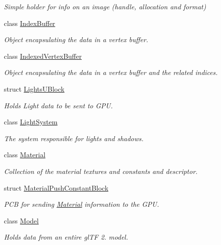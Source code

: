 \begin{DoxyCompactItemize}
\begin{DoxyCompactList}\small\item\em Simple holder for info on an image (handle, allocation and format) \end{DoxyCompactList}\item 
class \hyperlink{classblaze_1_1IndexBuffer}{Index\+Buffer}
\begin{DoxyCompactList}\small\item\em Object encapsulating the data in a vertex buffer. \end{DoxyCompactList}\item 
class \hyperlink{classblaze_1_1IndexedVertexBuffer}{Indexed\+Vertex\+Buffer}
\begin{DoxyCompactList}\small\item\em Object encapsulating the data in a vertex buffer and the related indices. \end{DoxyCompactList}\item 
struct \hyperlink{structblaze_1_1LightsUBlock}{Lights\+U\+Block}
\begin{DoxyCompactList}\small\item\em Holds Light data to be sent to G\+PU. \end{DoxyCompactList}\item 
class \hyperlink{classblaze_1_1LightSystem}{Light\+System}
\begin{DoxyCompactList}\small\item\em The system responsible for lights and shadows. \end{DoxyCompactList}\item 
class \hyperlink{classblaze_1_1Material}{Material}
\begin{DoxyCompactList}\small\item\em Collection of the material textures and constants and descriptor. \end{DoxyCompactList}\item 
struct \hyperlink{structblaze_1_1MaterialPushConstantBlock}{Material\+Push\+Constant\+Block}
\begin{DoxyCompactList}\small\item\em P\+CB for sending \hyperlink{classblaze_1_1Material}{Material} information to the G\+PU. \end{DoxyCompactList}\item 
class \hyperlink{classblaze_1_1Model}{Model}
\begin{DoxyCompactList}\small\item\em Holds data from an entire gl\+TF 2. model. \end{DoxyCompactList}\item 

\end{DoxyCompactItemize}
